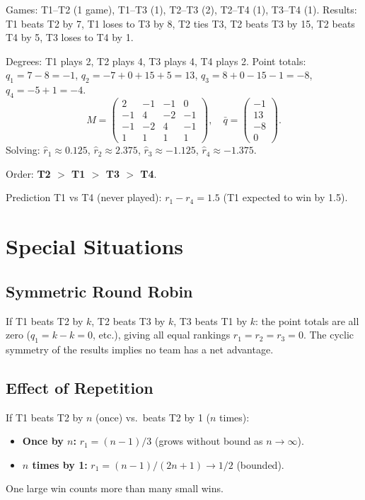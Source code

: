 \begin{example}
Games: T1--T2 (1 game), T1--T3 (1), T2--T3 (2), T2--T4 (1), T3--T4 (1).
Results: T1 beats T2 by 7, T1 loses to T3 by 8, T2 ties T3, T2 beats T3 by 15, T2 beats T4 by 5, T3 loses to T4 by 1.

Degrees: T1 plays 2, T2 plays 4, T3 plays 4, T4 plays 2. Point totals: $q_1=7-8=-1$, $q_2=-7+0+15+5=13$, $q_3=8+0-15-1=-8$, $q_4=-5+1=-4$.
\[
M=\begin{pmatrix}2&-1&-1&0\\-1&4&-2&-1\\-1&-2&4&-1\\1&1&1&1\end{pmatrix}, \quad
\bar{q}=\begin{pmatrix}-1\\13\\-8\\0\end{pmatrix}.
\]
Solving: $\hat{r}_1\approx0.125$, $\hat{r}_2\approx2.375$, $\hat{r}_3\approx-1.125$, $\hat{r}_4\approx-1.375$.

Order: \textbf{T2 $>$ T1 $>$ T3 $>$ T4}.

Prediction T1 vs T4 (never played): $r_1-r_4=1.5$ (T1 expected to win by 1.5).
\end{example}

\section{Special Situations}

\subsection*{Symmetric Round Robin}

If T1 beats T2 by $k$, T2 beats T3 by $k$, T3 beats T1 by $k$: the point totals are all zero ($q_1=k-k=0$, etc.), giving all equal rankings $r_1=r_2=r_3=0$. The cyclic symmetry of the results implies no team has a net advantage.

\subsection*{Effect of Repetition}

If T1 beats T2 by $n$ (once) vs.\ beats T2 by 1 ($n$ times):
\begin{itemize}
  \item \textbf{Once by $n$:} $r_1=(n-1)/3$ (grows without bound as $n\to\infty$).
  \item \textbf{$n$ times by 1:} $r_1=(n-1)/(2n+1)\to 1/2$ (bounded).
\end{itemize}
One large win counts more than many small wins.

